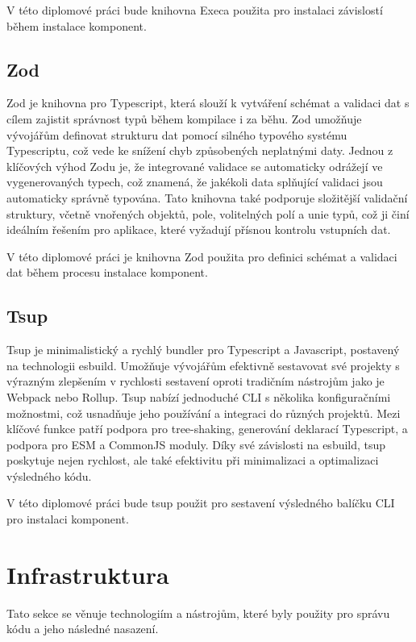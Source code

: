 V této diplomové práci bude knihovna Execa použita pro instalaci závislostí během instalace komponent.

\subsection{Zod}
Zod je knihovna pro Typescript, která slouží k vytváření schémat a validaci dat s cílem zajistit správnost typů během kompilace i za běhu. Zod umožňuje vývojářům definovat strukturu dat pomocí silného typového systému Typescriptu, což vede ke snížení chyb způsobených neplatnými daty. Jednou z klíčových výhod Zodu je, že integrované validace se automaticky odrážejí ve vygenerovaných typech, což znamená, že jakékoli data splňující validaci jsou automaticky správně typována. Tato knihovna také podporuje složitější validační struktury, včetně vnořených objektů, pole, volitelných polí a unie typů, což ji činí ideálním řešením pro aplikace, které vyžadují přísnou kontrolu vstupních dat. \cite{Zod}

V této diplomové práci je knihovna Zod použita pro definici schémat a validaci dat během procesu instalace komponent.

\subsection{Tsup}
Tsup je minimalistický a rychlý bundler pro Typescript a Javascript, postavený na technologii esbuild. Umožňuje vývojářům efektivně sestavovat své projekty s výrazným zlepšením v rychlosti sestavení oproti tradičním nástrojům jako je Webpack nebo Rollup. Tsup nabízí jednoduché CLI s několika konfiguračními možnostmi, což usnadňuje jeho používání a integraci do různých projektů. Mezi klíčové funkce patří podpora pro tree-shaking, generování deklarací Typescript, a podpora pro ESM a CommonJS moduly. Díky své závislosti na esbuild, tsup poskytuje nejen rychlost, ale také efektivitu při minimalizaci a optimalizaci výsledného kódu.  \cite{Tsup}

V této diplomové práci bude tsup použit pro sestavení výsledného balíčku CLI pro instalaci komponent.

\section{Infrastruktura}
Tato sekce se věnuje technologiím a nástrojům, které byly použity pro správu kódu a jeho následné nasazení.

